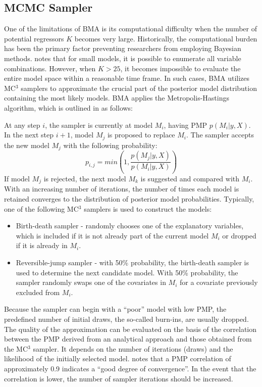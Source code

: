 \begin{refsection}
\begin{subappendices}
    \subsection*{\ac{MCMC} Sampler}
    \label{ch3sec:mc3}
    One of the limitations of \ac{BMA} is its computational difficulty when the number of potential regressors $K$ becomes very large. Historically, the computational burden has been the primary factor preventing researchers from employing Bayesian methods. \textcite{Zeugner2011} notes that for small models, it is possible to enumerate all variable combinations. However, when $K > 25$, it becomes impossible to evaluate the entire model space within a reasonable time frame. In such cases, \ac{BMA} utilizes MC$^{3}$ samplers to approximate the crucial part of the posterior model distribution containing the most likely models. \ac{BMA} applies the Metropolis-Hastings algorithm, which is outlined in \textcite{Zeugner2011} as follows:
    
    At any step $i$, the sampler is currently at model $M_{i}$, having \ac{PMP} $p(M_{i} \vert y,X)$. In the next step $i+1$, model $M_{j}$ is proposed to replace $M_{i}$. The sampler accepts the new model $M_{j}$ with the following probability:
    \begin{equation}\label{ch3eq:sampler}
    p_{i,j} = min \left( 1, \frac{p(M_{j} \vert y,X)}{p(M_{i} \vert y,X)}\right)
    \end{equation}
    If model $M_{j}$ is rejected, the next model $M_{k}$ is suggested and compared with $M_{i}$. With an increasing number of iterations, the number of times each model is retained converges to the distribution of posterior model probabilities. Typically, one of the following MC$^{3}$ samplers is used to construct the models:
    \begin{itemize}
        \item{Birth-death sampler - randomly chooses one of the explanatory variables, which is included if it is not already part of the current model $M_{i}$ or dropped if it is already in $M_{i}$.}
        \item{Reversible-jump sampler - with 50\% probability, the birth-death sampler is used to determine the next candidate model. With 50\% probability, the sampler randomly swaps one of the covariates in $M_{i}$ for a covariate previously excluded from $M_{i}$.}
    \end{itemize}
    Because the sampler can begin with a ``poor'' model with low \ac{PMP}, the predefined number of initial draws, the so-called burn-ins, are usually dropped. The quality of the approximation can be evaluated on the basis of the correlation between the \ac{PMP} derived from an analytical approach and those obtained from the MC$^{3}$ sampler. It depends on the number of iterations (draws) and the likelihood of the initially selected model. \textcite{Zeugner2011} notes that a \ac{PMP} correlation of approximately 0.9 indicates a ``good degree of convergence''. In the event that the correlation is lower, the number of sampler iterations should be increased.
  \end{subappendices}
\end{refsection}
